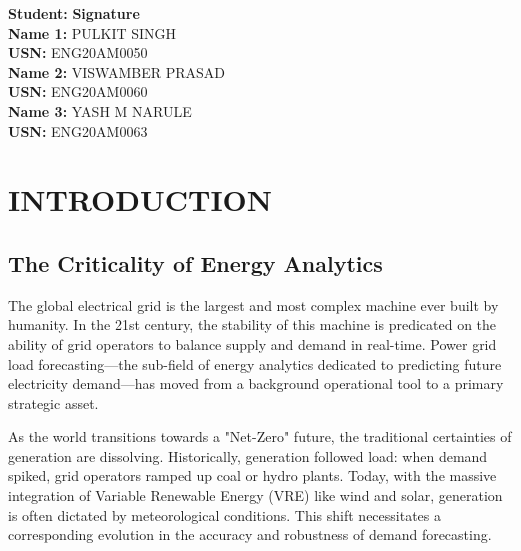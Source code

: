 \documentclass[12pt,a4paper,twoside,fleqn]{report}
\begin{document}
\noindent
\begin{minipage}{0.8\textwidth}
    \textbf{Student:} \hfill\textbf{Signature}\\
    
    \textbf{Name 1:} PULKIT SINGH\\ \textbf{USN:} ENG20AM0050 \\
    
    \textbf{Name 2:} VISWAMBER PRASAD \\ \textbf{USN:} ENG20AM0060 \\
    
    \textbf{Name 3:} YASH M NARULE \\ \textbf{USN:} ENG20AM0063 \\

\end{minipage}

\newpage
\pagestyle{plain}
\tableofcontents
\newpage
\listoffigures
\newpage
\listoftables

\newpage
{}
\pagestyle{combined}

\chapter{INTRODUCTION}
\section{The Criticality of Energy Analytics}
The global electrical grid is the largest and most complex machine ever built by humanity. In the 21st century, the stability of this machine is predicated on the ability of grid operators to balance supply and demand in real-time. Power grid load forecasting—the sub-field of energy analytics dedicated to predicting future electricity demand—has moved from a background operational tool to a primary strategic asset. 

As the world transitions towards a "Net-Zero" future, the traditional certainties of generation are dissolving. Historically, generation followed load: when demand spiked, grid operators ramped up coal or hydro plants. Today, with the massive integration of Variable Renewable Energy (VRE) like wind and solar, generation is often dictated by meteorological conditions. This shift necessitates a corresponding evolution in the accuracy and robustness of demand forecasting.
\end{document}
